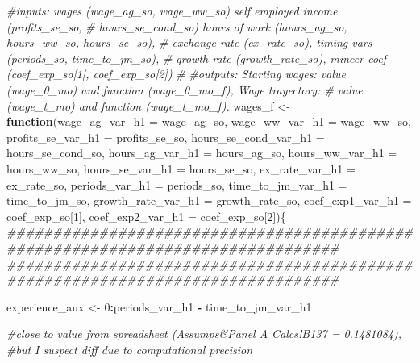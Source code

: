 \documentclass[]{article}
\newenvironment{Shaded}{\begin{snugshade}}{\end{snugshade}}
\newcommand{\CommentTok}[1]{\textcolor[rgb]{0.56,0.35,0.01}{\textit{#1}}}
\newcommand{\ControlFlowTok}[1]{\textcolor[rgb]{0.13,0.29,0.53}{\textbf{#1}}}
\newcommand{\DataTypeTok}[1]{\textcolor[rgb]{0.13,0.29,0.53}{#1}}
\newcommand{\DecValTok}[1]{\textcolor[rgb]{0.00,0.00,0.81}{#1}}
\newcommand{\NormalTok}[1]{#1}
\newcommand{\OperatorTok}[1]{\textcolor[rgb]{0.81,0.36,0.00}{\textbf{#1}}}
\newcommand{\StringTok}[1]{\textcolor[rgb]{0.31,0.60,0.02}{#1}}
\begin{document}
\begin{Shaded}
\begin{Highlighting}[]
\CommentTok{#inputs: wages (wage_ag_so, wage_ww_so) self employed income (profits_se_so, }
\CommentTok{#  hours_se_cond_so) hours of work (hours_ag_so, hours_ww_so, hours_se_so), }
\CommentTok{#  exchange rate (ex_rate_so), timing vars (periods_so, time_to_jm_so), }
\CommentTok{#  growth rate (growth_rate_so), mincer coef (coef_exp_so[1], coef_exp_so[2])}
\CommentTok{#}
\CommentTok{#outputs: Starting wages: value (wage_0_mo) and function (wage_0_mo_f), Wage trayectory:}
\CommentTok{#  value (wage_t_mo) and function (wage_t_mo_f).}
\NormalTok{wages_f <-}\StringTok{ }\ControlFlowTok{function}\NormalTok{(}\DataTypeTok{wage_ag_var_h1 =}\NormalTok{ wage_ag_so,  }
                     \DataTypeTok{wage_ww_var_h1 =}\NormalTok{ wage_ww_so,}
                     \DataTypeTok{profits_se_var_h1 =}\NormalTok{ profits_se_so,}
                     \DataTypeTok{hours_se_cond_var_h1 =}\NormalTok{ hours_se_cond_so,  }
                     \DataTypeTok{hours_ag_var_h1 =}\NormalTok{ hours_ag_so,}
                     \DataTypeTok{hours_ww_var_h1 =}\NormalTok{ hours_ww_so,}
                     \DataTypeTok{hours_se_var_h1 =}\NormalTok{ hours_se_so,}
                     \DataTypeTok{ex_rate_var_h1 =}\NormalTok{ ex_rate_so, }
                     \DataTypeTok{periods_var_h1 =}\NormalTok{ periods_so, }
                     \DataTypeTok{time_to_jm_var_h1 =}\NormalTok{ time_to_jm_so, }
                     \DataTypeTok{growth_rate_var_h1 =}\NormalTok{ growth_rate_so,}
                     \DataTypeTok{coef_exp1_var_h1 =}\NormalTok{ coef_exp_so[}\DecValTok{1}\NormalTok{],}
                     \DataTypeTok{coef_exp2_var_h1 =}\NormalTok{ coef_exp_so[}\DecValTok{2}\NormalTok{])\{}
\CommentTok{################################################################################}
\CommentTok{################################################################################  }

\NormalTok{    experience_aux <-}\StringTok{ }\DecValTok{0}\OperatorTok{:}\NormalTok{periods_var_h1 }\OperatorTok{-}\StringTok{ }\NormalTok{time_to_jm_var_h1}

    \CommentTok{#close to value from spreadsheet (Assumps&Panel A Calcs!B137 = 0.1481084),}
    \CommentTok{#but I suspect diff due to computational precision}
    

\end{Highlighting}
\end{Shaded}
\end{document}
